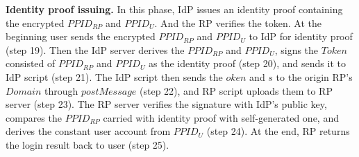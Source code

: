 \vspace{0.5mm}\noindent\textbf{Identity proof issuing.} In this phase, IdP issues an identity proof containing the encrypted $PPID_{RP}$ and $PPID_U$. And the RP verifies the token.
At the beginning user sends the encrypted $PPID_{RP}$ and $PPID_U$ to IdP for identity proof (step 19). 
Then the IdP server derives the $PPID_{RP}$ and $PPID_U$, signs the $Token$ consisted of $PPID_{RP}$ and $PPID_U$ as the identity proof (step 20), and sends it to IdP script (step 21). 
The IdP script then sends the $oken$ and $s$ to the origin RP's $Domain$ through $postMessage$ (step 22), and  RP script uploads them to RP server (step 23). 
The RP server verifies the signature with IdP's public key, compares the $PPID_{RP}$ carried with identity proof with self-generated one, and derives the constant user account from $PPID_U$ (step 24). 
At the end, RP returns the login result back to user (step 25).

